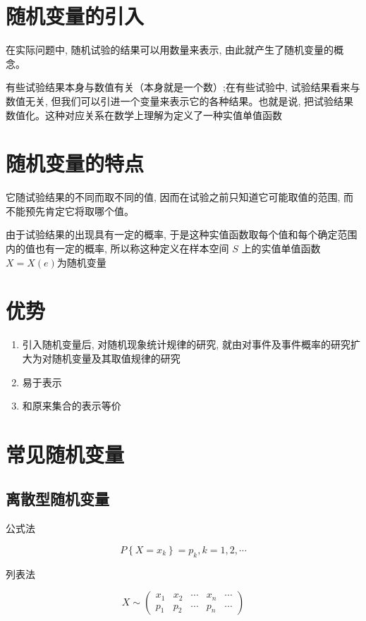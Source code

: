 
\section{随机变量的引入}

在实际问题中, 随机试验的结果可以用数量来表示, 由此就产生了随机变量的概念。

有些试验结果本身与数值有关（本身就是一个数）;在有些试验中, 试验结果看来与数值无关, 但我们可以引进一个变量来表示它的各种结果。也就是说, 把试验结果数值化。这种对应关系在数学上理解为定义了一种实值单值函数

\section{随机变量的特点}

它随试验结果的不同而取不同的值, 因而在试验之前只知道它可能取值的范围, 而不能预先肯定它将取哪个值。

由于试验结果的出现具有一定的概率, 于是这种实值函数取每个值和每个确定范围内的值也有一定的概率, 所以称这种定义在样本空间 $S$ 上的实值单值函数 $X= X(e)$为随机变量

\section{优势}

\begin{enumerate}
    \item 引入随机变量后, 对随机现象统计规律的研究, 就由对事件及事件概率的研究扩大为对随机变量及其取值规律的研究
    \item 易于表示
    \item 和原来集合的表示等价
\end{enumerate}

\section{常见随机变量}

\subsection{离散型随机变量}

公式法

$$
{P}\left\{{X}={x}_{k}\right\}={p}_{k}, {k}=1,2, \cdots
$$

列表法
  
$$X \sim\left(\begin{array}{lllll}x_{1} & x_{2} & \cdots & x_{n} & \cdots \\ p_{1} & p_{2} & \cdots & p_{n} & \cdots\end{array}\right)$$

